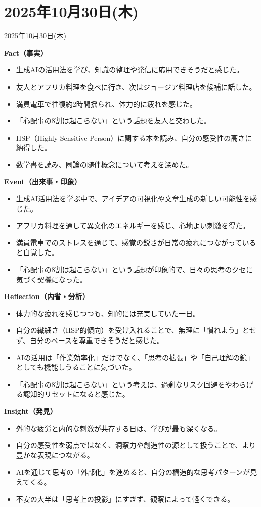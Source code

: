 \documentclass[dvipdfmx, autodetect-engine, aspectratio=169, 10.5pt]{beamer}
\begin{document}
\section{2025年10月30日(木)}
\begin{frame}{2025年10月30日(木)}
	\tiny

	\textbf{Fact（事実）}
	\begin{itemize}
		\item 生成AIの活用法を学び、知識の整理や発信に応用できそうだと感じた。
		\item 友人とアフリカ料理を食べに行き、次はジョージア料理店を候補に話した。
		\item 満員電車で往復約2時間揺られ、体力的に疲れを感じた。
		\item 「心配事の8割は起こらない」という話題を友人と交わした。
		\item HSP（Highly Sensitive Person）に関する本を読み、自分の感受性の高さに納得した。
		\item 数学書を読み、圏論の随伴概念について考えを深めた。
	\end{itemize}

	\textbf{Event（出来事・印象）}
	\begin{itemize}
		\item 生成AI活用法を学ぶ中で、アイデアの可視化や文章生成の新しい可能性を感じた。
		\item アフリカ料理を通して異文化のエネルギーを感じ、心地よい刺激を得た。
		\item 満員電車でのストレスを通じて、感覚の鋭さが日常の疲れにつながっていると自覚した。
		\item 「心配事の8割は起こらない」という話題が印象的で、日々の思考のクセに気づく契機になった。
	\end{itemize}

	\textbf{Reflection（内省・分析）}
	\begin{itemize}
		\item 体力的な疲れを感じつつも、知的には充実していた一日。
		\item 自分の繊細さ（HSP的傾向）を受け入れることで、無理に「慣れよう」とせず、自分のペースを尊重できそうだと感じた。
		\item AIの活用は「作業効率化」だけでなく、「思考の拡張」や「自己理解の鏡」としても機能しうることに気づいた。
		\item 「心配事の8割は起こらない」という考えは、過剰なリスク回避をやわらげる認知的リセットになると感じた。
	\end{itemize}

	\textbf{Insight（発見）}
	\begin{itemize}
		\item 外的な疲労と内的な刺激が共存する日は、学びが最も深くなる。
		\item 自分の感受性を弱点ではなく、洞察力や創造性の源として扱うことで、より豊かな表現につながる。
		\item AIを通じて思考の「外部化」を進めると、自分の構造的な思考パターンが見えてくる。
		\item 不安の大半は「思考上の投影」にすぎず、観察によって軽くできる。
	\end{itemize}


\end{frame}
\end{document}
